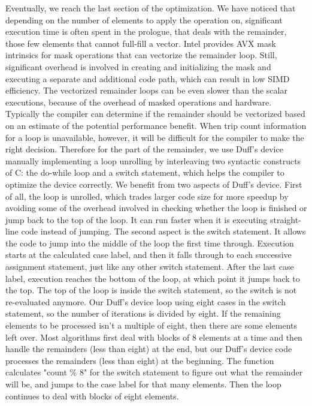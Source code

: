 \documentclass[sigconf]{acmart}
\begin{document}
Eventually, we reach the last section of the optimization. We have
noticed that depending on the number of elements to apply the
operation on, significant execution time is often spent in the
prologue, that deals with the remainder, those few elements that cannot full-fill a vector.
Intel provides AVX mask intrinsics for mask operations that can vectorize the remainder loop.
Still, significant overhead is involved in creating and initializing the mask and
executing a separate and additional code path, which can result in low SIMD efficiency.
%
The vectorized remainder loops can be even slower than the scalar executions,
because of the overhead of masked operations and hardware.
%
Typically the compiler can determine if the remainder should be vectorized
based on an estimate of the potential performance benefit. When trip count information for a
loop is unavailable, however, it will be difficult for the
compiler to make the right decision.
%
Therefore for the part of the remainder, we use Duff's
device~\cite{wiki:duff} manually implementing a loop unrolling by
interleaving two syntactic constructs of C: the do-while loop and a
switch statement, which helps the compiler to optimize the device
correctly.
%
We benefit from two aspects of Duff's device. First of all, the loop is unrolled,
which trades larger code size for more speedup by avoiding some of the overhead
involved in checking whether the loop is finished or jump back to the
top of the loop.
It can run faster when it is executing straight-line code instead of jumping.
The second aspect is the switch statement. It allows the code to jump into the middle of the
loop the first time through.
Execution starts at the calculated case label, and then it falls through to each successive
assignment statement, just like any other switch statement.
%
After the last case label, execution reaches the bottom of the loop, at which point it jumps back to the top. The top of the loop is inside the switch statement, so the switch is not re-evaluated anymore.
%
Our Duff's device loop using eight cases in the switch statement, so the number of iterations is divided by eight.
If the remaining elements to be processed isn't a multiple of eight, then there are some elements left over.
Most algorithms first deal with blocks of 8 elements at a time and then handle the remainders (less than eight) at the end,
but our Duff's device code processes the remainders (less than eight) at the beginning.
The function calculates "count \% 8" for the switch statement to figure out what the remainder will be, and jumps to the case label for that many elements.
Then the loop continues to deal with blocks of eight elements.
\end{document}
